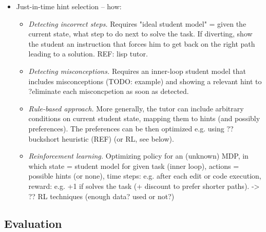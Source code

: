 \begin{itemize}
\item Just-in-time hint selection -- how:
\begin{itemize}
\item \emph{Detecting incorrect steps.}
  Requires "ideal student model" = given the current state, what step to do
  next to solve the task.
  If diverting, show the student an instruction that forces him to get back on
  the right path leading to a solution.
  REF: lisp tutor.
\item \emph{Detecting misconceptions.}
  Requires an inner-loop student model that includes misconceptions (TODO: example)
  and showing a relevant hint to ?eliminate each misconcpetion as soon as detected.
\item \emph{Rule-based approach.}
  More generally, the tutor can include arbitrary conditions on current student state,
  mapping them to hints (and possibly preferences).
  The preferences can be then optimized e.g. using ?? buckshort heuristic (REF) (or RL, see below).
\item \emph{Reinforcement learning.}
  Optimizing policy for an (unknown) MDP, in which
  state = student model for given task (inner loop),
  actions = possible hints (or none),
  time steps: e.g. after each edit or code execution,
  reward: e.g. +1 if solves the task (+ discount to prefer shorter paths).
  -> ?? RL techniques (enough data? used or not?)
\end{itemize}
\end{itemize}


\subsection{Evaluation}

